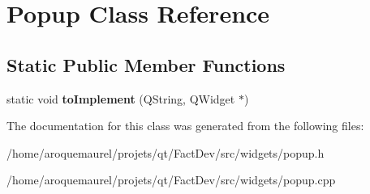 \hypertarget{classPopup}{\section{Popup Class Reference}
\label{classPopup}
}
\subsection*{Static Public Member Functions}
\begin{DoxyCompactItemize}
\item 
\hypertarget{classPopup_aa3173e0f473b42f08363c4ef17c93a07}{static void {\bfseries to\-Implement} (Q\-String, Q\-Widget $\ast$)}\label{classPopup_aa3173e0f473b42f08363c4ef17c93a07}

\end{DoxyCompactItemize}


The documentation for this class was generated from the following files\-:\begin{DoxyCompactItemize}
\item 
/home/aroquemaurel/projets/qt/\-Fact\-Dev/src/widgets/popup.\-h\item 
/home/aroquemaurel/projets/qt/\-Fact\-Dev/src/widgets/popup.\-cpp\end{DoxyCompactItemize}
